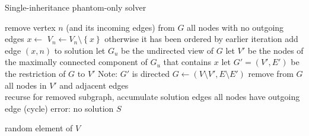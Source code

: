 \begin{algorithm} 
  \caption{Single-inheritance phantom-only solver}
  \label{alg:single:simple}
  \hrulefill

  \begin{algorithmic}[1]
    \State \Return {}
    \EndFunction
  \end{algorithmic}

  \hrulefill

  \begin{algorithmic}[1]
       \State remove vertex $n$ (and its incoming edges) from $G$ 
        \Comment all nodes with no outgoing edges
          \State $x \gets$ 
          \State $V_n \gets V_n \setminus \left\{x\right\}$ 
           \Comment otherwise it has been ordered by earlier iteration
              \Comment add edge $(x,n)$ to solution
             \State let $G_u$ be the undirected view of $G$ 
             \State let $V'$ be the nodes of the maximally connected 
               component of $G_u$ that contains $x$
             \State let $G' = (V',E')$ be the restriction of $G$ to $V'$ \Comment Note: $G'$ is directed
             \State $G \gets (V \setminus V', E \setminus E')$ \Comment remove from $G$ all nodes in $V'$ and adjacent edges
              \\
                               \Comment recurse for removed subgraph, accumulate solution edges
          \EndIf
       \EndWhile
        \Comment all nodes have outgoing edge (cycle)
         \State error: no solution  \label{lst:line:cycle}  %
       \EndIf
       \State \Return $S$
    \EndFunction
  \end{algorithmic}

  \hrulefill

  \begin{algorithmic}[1]
    \State \Return random element of $V$
    \EndFunction
  \end{algorithmic}
\end{algorithm} 


